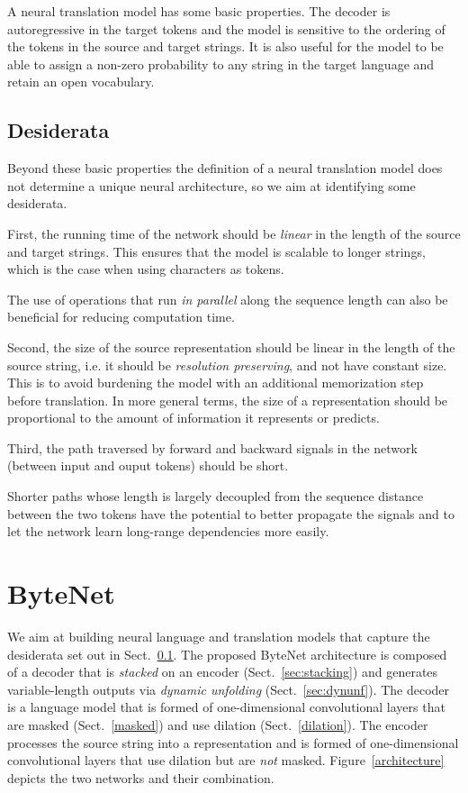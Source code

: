 A neural translation model has some basic properties. The decoder is autoregressive in the target tokens and the model is sensitive to the ordering of the tokens in the source and target strings. It is also useful for the model to be able to assign a non-zero probability to any string in the target language and retain an open vocabulary.

\subsection{Desiderata}
\label{desiderata}

Beyond these basic properties the definition of a neural translation model does not determine a unique neural architecture, so we aim at identifying some desiderata.

First, the running time of the network should be \emph{linear} in the length of the source and target strings. This ensures that the model is scalable to longer strings, which is the case when using characters as tokens.

The use of operations that run \emph{in parallel} along the sequence length can also be beneficial for reducing computation time.

Second, the size of the source representation should be linear in the length of the source string, i.e. it should be \emph{resolution preserving}, and not have constant size. This is to avoid burdening the model with an additional memorization step before translation. In more general terms, the size of a representation should be proportional to the amount of information it represents or predicts. 

Third, the path traversed by forward and backward signals in the network (between input and ouput tokens) should be short.

Shorter paths whose length is largely decoupled from the sequence distance between the two tokens have the potential to better propagate the signals \citep{chapter-gradient-flow-2001} and to let the network learn long-range dependencies more easily. 

\section{ByteNet}
\label{bytenet}
We aim at building neural language and translation models that capture the desiderata set out in Sect.~\ref{desiderata}. The proposed ByteNet architecture is composed of a decoder that is \emph{stacked} on an encoder (Sect.~\ref{sec:stacking}) and generates variable-length outputs via \emph{dynamic unfolding} (Sect.~\ref{sec:dynunf}). The decoder is a language model that is formed of one-dimensional convolutional layers that are masked (Sect.~\ref{masked}) and use dilation (Sect.~\ref{dilation}).  The encoder processes the source string into a representation and is formed of one-dimensional convolutional layers that use dilation but are \emph{not} masked. Figure~\ref{architecture} depicts the two networks and their combination. 

